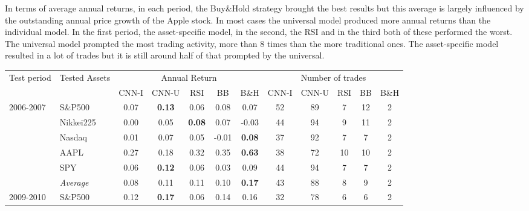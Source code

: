 \documentclass[11pt, a4paper]{article}
\begin{document}
In terms of average annual returns, in each period, the Buy\&Hold strategy brought the best results but this average is largely influenced by the outstanding annual price growth of the Apple stock. In most cases the universal model produced more annual returns than the individual model. In the first period, the asset-specific model, in the second, the RSI and in the third both of these performed the worst. The universal model prompted the most trading activity, more than 8 times than the more traditional ones. The asset-specific model resulted in a lot of trades but it is still around half of that prompted by the universal. 

\begin{table}[H]
\begin{tabular}{l|l|ccccc|ccccc}
\multicolumn{1}{m{1cm}|}{\multirow{2}{1cm}{Test period}} & \multicolumn{1}{m{1.5cm}|}{\multirow{2}{1.5cm}{Tested Assets}} &       \multicolumn{5}{c|}{Annual Return} & \multicolumn{5}{c}{Number of trades} \\ \cline{3-12}
  &                  &  CNN-I         & CNN-U         & RSI           & BB            & B\&H          & CNN-I            & CNN-U & RSI & BB & B\&H \\ \hline \hline
\multirow{6}{1cm}{2006-2007} & S\&P500       & 0.07          & \textbf{0.13} & 0.06          & 0.08          & 0.07          & 52               & 89    & 7   & 12 & 2    \\
  & Nikkei225        &  0.00          & 0.05          & \textbf{0.08} & 0.07          & -0.03         & 44               & 94    & 9   & 11 & 2    \\
  & Nasdaq       & 0.01          & 0.07          & 0.05          & -0.01         & \textbf{0.08} & 37               & 92    & 7   & 7  & 2    \\
  & AAPL             & 0.27          & 0.18          & 0.32          & 0.35          & \textbf{0.63} & 38               & 72    & 10  & 10 & 2    \\
  & SPY              & 0.06          & \textbf{0.12} & 0.06          & 0.03          & 0.09          & 44               & 94    & 7   & 7  & 2    \\ \cline{2-12}
  & \textit{Average}  & 0.08          & 0.11          & 0.11          & 0.10          & \textbf{0.17} & 43               & 88    & 8   & 9  & 2    \\ \hline
\multirow{6}{1cm}{2009-2010} & S\&P500    & 0.12          & \textbf{0.17} & 0.06          & 0.14          & 0.16          & 32               & 78    & 6   & 6  & 2    \\

\end{tabular}
\end{table}
\end{document}
